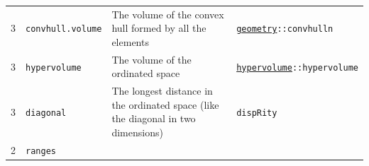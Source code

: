 \documentclass[]{book}
\theoremstyle{definition}
\theoremstyle{definition}
\theoremstyle{remark}
\begin{document}
\begin{longtable}[]{@{}llll@{}}
\begin{minipage}[t]{0.08\columnwidth}
3\strut
\end{minipage} & \begin{minipage}[t]{0.08\columnwidth}\raggedright\strut
\texttt{convhull.volume}\strut
\end{minipage} & \begin{minipage}[t]{0.61\columnwidth}\raggedright\strut
The volume of the convex hull formed by all the elements\strut
\end{minipage} & \begin{minipage}[t]{0.11\columnwidth}\raggedright\strut
\href{https://cran.r-project.org/web/packages/geometry/index.html}{\texttt{geometry}}\texttt{::convhulln}\strut
\end{minipage}\tabularnewline
\begin{minipage}[t]{0.08\columnwidth}\raggedright\strut
3\strut
\end{minipage} & \begin{minipage}[t]{0.08\columnwidth}\raggedright\strut
\texttt{hypervolume}\strut
\end{minipage} & \begin{minipage}[t]{0.61\columnwidth}\raggedright\strut
The volume of the ordinated space\strut
\end{minipage} & \begin{minipage}[t]{0.11\columnwidth}\raggedright\strut
\href{https://cran.r-project.org/web/packages/hypervolume/index.html}{\texttt{hypervolume}}\texttt{::hypervolume}\strut
\end{minipage}\tabularnewline
\begin{minipage}[t]{0.08\columnwidth}\raggedright\strut
3\strut
\end{minipage} & \begin{minipage}[t]{0.08\columnwidth}\raggedright\strut
\texttt{diagonal}\strut
\end{minipage} & \begin{minipage}[t]{0.61\columnwidth}\raggedright\strut
The longest distance in the ordinated space (like the diagonal in two
dimensions)\strut
\end{minipage} & \begin{minipage}[t]{0.11\columnwidth}\raggedright\strut
\texttt{dispRity}\strut
\end{minipage}\tabularnewline
\begin{minipage}[t]{0.08\columnwidth}\raggedright\strut
2\strut
\end{minipage} & \begin{minipage}[t]{0.08\columnwidth}\raggedright\strut
\texttt{ranges}\strut

\end{minipage}
\end{longtable}
\end{document}
